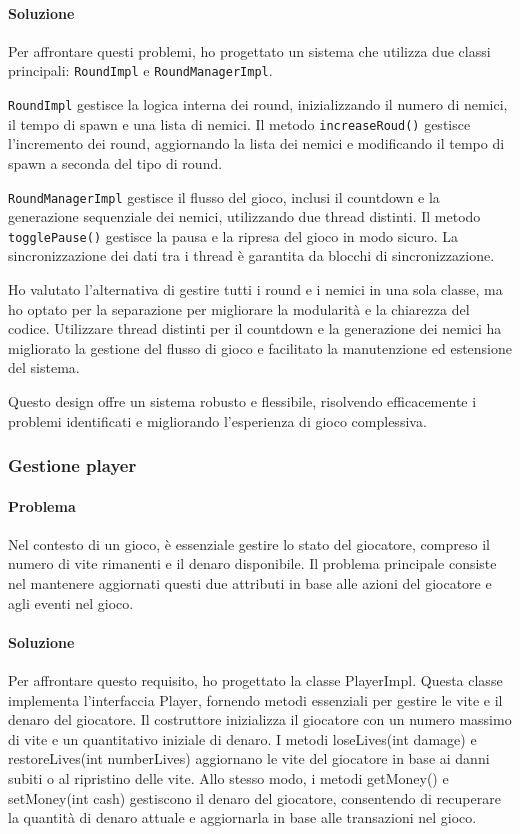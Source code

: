 \documentclass[a4paper,12pt]{report}
\begin{document}
\paragraph{Soluzione} Per affrontare questi problemi, ho progettato un sistema che utilizza due classi principali: \texttt{RoundImpl} e \texttt{RoundManagerImpl}.

\texttt{RoundImpl} gestisce la logica interna dei round, inizializzando il numero di nemici, il tempo di spawn e una lista di nemici. Il metodo \texttt{increaseRoud()} gestisce l'incremento dei round, aggiornando la lista dei nemici e modificando il tempo di spawn a seconda del tipo di round.

\texttt{RoundManagerImpl} gestisce il flusso del gioco, inclusi il countdown e la generazione sequenziale dei nemici, utilizzando due thread distinti. Il metodo \texttt{togglePause()} gestisce la pausa e la ripresa del gioco in modo sicuro. La sincronizzazione dei dati tra i thread è garantita da blocchi di sincronizzazione.

Ho valutato l'alternativa di gestire tutti i round e i nemici in una sola classe, ma ho optato per la separazione per migliorare la modularità e la chiarezza del codice. Utilizzare thread distinti per il countdown e la generazione dei nemici ha migliorato la gestione del flusso di gioco e facilitato la manutenzione ed estensione del sistema.

Questo design offre un sistema robusto e flessibile, risolvendo efficacemente i problemi identificati e migliorando l'esperienza di gioco complessiva.

\subsubsection{Gestione player}
\paragraph{Problema} Nel contesto di un gioco, è essenziale gestire lo stato del giocatore, compreso il numero di vite rimanenti e il denaro disponibile. Il problema principale consiste nel mantenere aggiornati questi due attributi in base alle azioni del giocatore e agli eventi nel gioco.
\paragraph{Soluzione} Per affrontare questo requisito, ho progettato la classe PlayerImpl. Questa classe implementa l'interfaccia Player, fornendo metodi essenziali per gestire le vite e il denaro del giocatore. Il costruttore inizializza il giocatore con un numero massimo di vite e un quantitativo iniziale di denaro. I metodi loseLives(int damage) e restoreLives(int numberLives) aggiornano le vite del giocatore in base ai danni subiti o al ripristino delle vite. Allo stesso modo, i metodi getMoney() e setMoney(int cash) gestiscono il denaro del giocatore, consentendo di recuperare la quantità di denaro attuale e aggiornarla in base alle transazioni nel gioco.
\end{document}
